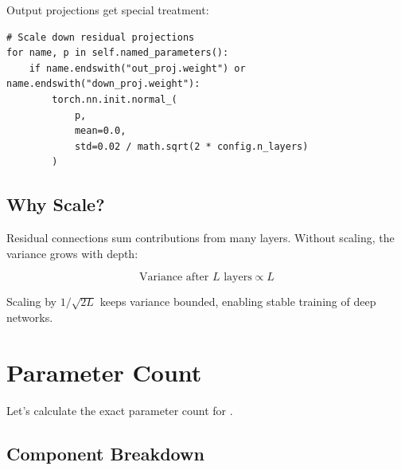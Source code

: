 Output projections get special treatment:

\begin{lstlisting}[style=python]
# Scale down residual projections
for name, p in self.named_parameters():
    if name.endswith("out_proj.weight") or name.endswith("down_proj.weight"):
        torch.nn.init.normal_(
            p,
            mean=0.0,
            std=0.02 / math.sqrt(2 * config.n_layers)
        )
\end{lstlisting}

\subsection{Why Scale?}

Residual connections sum contributions from many layers. Without scaling, the variance grows with depth:

\begin{equation}
\text{Variance after } L \text{ layers} \propto L
\end{equation}

Scaling by $1/\sqrt{2L}$ keeps variance bounded, enabling stable training of deep networks.

\section{Parameter Count}

Let's calculate the exact parameter count for \TryLM.

\subsection{Component Breakdown}

